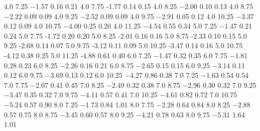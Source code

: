4.0 7.25 −1.57 0.16 0.21 
4.0 7.75 -1.77 0.14 0.15
4.0 8.25 −2.00 0.10 0.13
4.0 8.75 −2.22 0.09 0.09
4.0 9.25 −2.52 0.09 0.09
4.0 9.75 −2.91 0.05 0.12
4.0 10.25 −3.37 0.12 0.09
4.0 10.75 −4.00 0.25 0.20
4.0 11.25 −4.54 0.55 0.34
5.0 7.25 −1.47 0.21 0.24
5.0 7.75 -1.72 0.20 0.20
5.0 8.25 -2.01 0.16 0.16
5.0 8.75 -2.33 0.10 0.15
5.0 9.25 -2.68 0.14 0.07
5.0 9.75 -3.12 0.11 0.09
5.0 10.25 -3.47 0.14 0.16
5.0 10.75 -4.12 0.38 0.25
5.0 11.25 -4.88 0.61 0.40
6.0 7.25 −1.47 0.32 0.35
6.0 7.75 −1.81 0.28 0.23
6.0 8.25 −2.26 0.16 0.21
6.0 8.75 −2.65 0.15 0.15
6.0 9.25 −3.14 0.11 0.12
6.0 9.75 −3.69 0.13 0.12
6.0 10.25 −4.27 0.86 0.38
7.0 7.25 −1.63 0.54 0.54
7.0 7.75 −2.07 0.41 0.45
7.0 8.25 −2.49 0.32 0.38
7.0 8.75 −2.96 0.30 0.32
7.0 9.25 −3.47 0.35 0.32
7.0 9.75 −4.11 0.57 0.41
7.0 10.25 −4.61 0.82 0.72
7.0 10.75 −5.24 0.57 0.90
8.0 7.25 −1.73 0.84 1.01
8.0 7.75 −2.28 0.64 0.84
8.0 8.25 −2.88 0.57 0.75
8.0 8.75 −3.45 0.60 0.57
8.0 9.25 −4.21 0.78 0.63
8.0 9.75 −5.31 1.64 1.01
